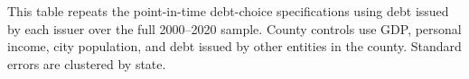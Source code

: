 \newpage
\begin{table}[H]\centering
\caption{\textbf{Debt Choice: Full-Period Issuer Aggregates}}
\label{tab:debt_choice_full_sample_issuer_aggregate}
\parbox{\textwidth}{This table repeats the point-in-time debt-choice specifications using debt issued by each issuer over the full 2000--2020 sample. County controls use GDP, personal income, city population, and debt issued by other entities in the county. Standard errors are clustered by state.}
\end{table}

\vspace{10pt}

\vspace{10pt}

\vspace{10pt}

